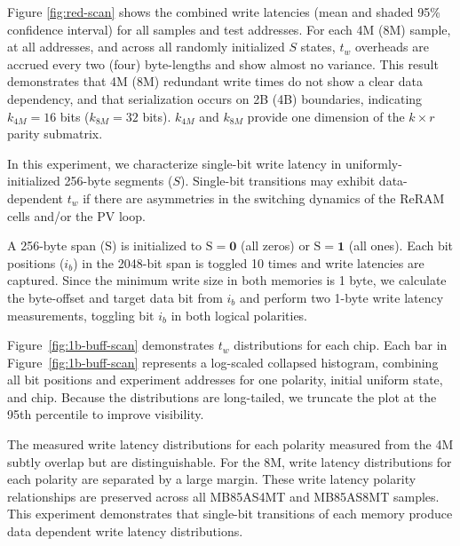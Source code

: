 




Figure \ref{fig:red-scan} shows the combined write latencies (mean and shaded 95\% confidence interval) for all samples and test addresses. For each 4M (8M) sample, at all addresses, and across all randomly initialized $S$ states, $t_w$ overheads are accrued every two (four) byte-lengths and show almost no variance. This result demonstrates that 4M (8M) redundant write times do not show a clear data dependency, and that serialization occurs on 2B (4B) boundaries, indicating $k_{4M}=16$ bits ($k_{8M}=32$ bits). $k_{4M}$ and $k_{8M}$ provide one dimension of the $k\times r$ parity submatrix.


\label{exp:ii}
In this experiment, we characterize single-bit write latency in uniformly-initialized 256-byte segments ($S$).
Single-bit transitions may exhibit data-dependent $t_w$ if there are asymmetries in the switching dynamics of the ReRAM cells and/or the PV loop.

% 


A 256-byte span ($\mathrm{S}$) is initialized to $\mathrm{S}=\mathbf{0}$ (all zeros)  or $\mathrm{S}=\mathbf{1}$  (all ones). Each bit positions ($i_b$) in the 2048-bit span is toggled 10 times and write latencies are captured. Since the minimum write size in both memories is 1 byte, we calculate the byte-offset and target data bit from $i_b$ and perform two 1-byte write latency measurements, toggling bit $i_b$ in both logical polarities.


Figure~\ref{fig:1b-buff-scan} demonstrates $t_w$ distributions for each chip.
Each bar in Figure~\ref{fig:1b-buff-scan} represents a log-scaled collapsed histogram, combining all bit positions and experiment addresses for one polarity, initial uniform state, and chip. 
Because the distributions are long-tailed, we truncate the plot at the 95th percentile to improve visibility.

The measured write latency distributions for each polarity measured from the 4M subtly overlap but are distinguishable. For the 8M, write latency distributions for each polarity are separated by a large margin. These write latency polarity relationships are preserved across all MB85AS4MT and MB85AS8MT samples. This experiment demonstrates that single-bit transitions of each memory produce data dependent write latency distributions.

